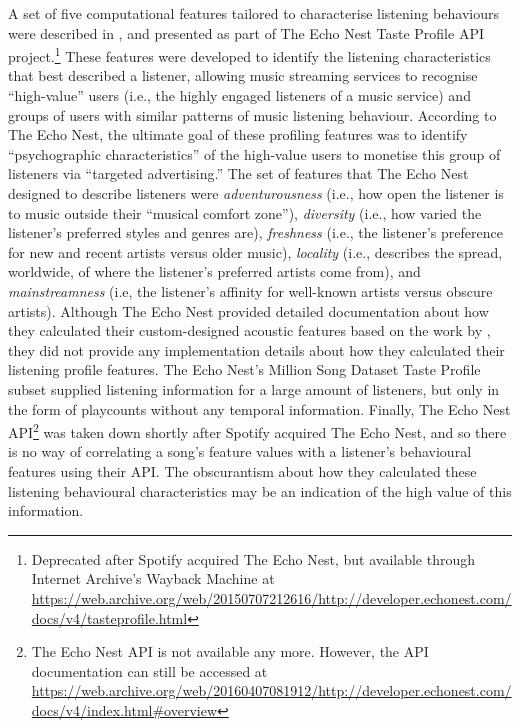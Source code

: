 A set of five computational features tailored to characterise listening behaviours were described in \textcite{echonest13how}, and presented as part of The Echo Nest Taste Profile API project.\footnote{Deprecated after Spotify acquired The Echo Nest, but available through Internet Archive's Wayback Machine at \url{https://web.archive.org/web/20150707212616/http://developer.echonest.com/docs/v4/tasteprofile.html}} These features were developed to identify the listening characteristics that best described a listener, allowing music streaming services to recognise ``high-value'' users (i.e., the highly engaged listeners of a music service) and groups of users with similar patterns of music listening behaviour. According to The Echo Nest, the ultimate goal of these profiling features was to identify ``psychographic characteristics'' of the high-value users to monetise this group of listeners via ``targeted advertising.''
The set of features that The Echo Nest designed to describe listeners were \textit{adventurousness} (i.e., how open the listener is to music outside their ``musical comfort zone''), \textit{diversity} (i.e., how varied the listener’s preferred styles and genres are), \textit{freshness} (i.e., the listener's preference for new and recent artists versus older music), \textit{locality} (i.e., describes the spread, worldwide, of where the listener's preferred artists come from), and \textit{mainstreamness} (i.e, the listener's affinity for well-known artists versus obscure artists). 
Although The Echo Nest provided detailed documentation about how they calculated their custom-designed acoustic features based on the work by \textcite{jehan05creating}, they did not provide any implementation details about how they calculated their listening profile features. 
The Echo Nest's Million Song Dataset Taste Profile subset supplied listening information for a large amount of listeners, but only in the form of playcounts without any temporal information. 
Finally, The Echo Nest API\footnote{The Echo Nest API is not available any more. However, the API documentation can still be accessed at \url{https://web.archive.org/web/20160407081912/http://developer.echonest.com/docs/v4/index.html#overview}} was taken down shortly after Spotify acquired The Echo Nest, and so there is no way of correlating a song's feature values with a listener's behavioural features using their API. The obscurantism about how they calculated these listening behavioural characteristics may be an indication of the high value of this information.

